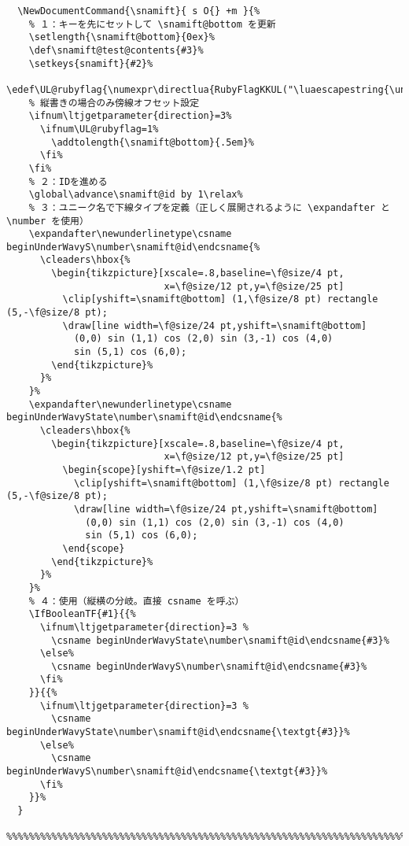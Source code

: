 \documentclass[luatex,fontsize=8pt,paper=b5,twoside]{jlreq}%
\begin{document}
\begin{lstlisting}
  \NewDocumentCommand{\snamift}{ s O{} +m }{%
    % １：キーを先にセットして \snamift@bottom を更新
    \setlength{\snamift@bottom}{0ex}%
    \def\snamift@test@contents{#3}%
    \setkeys{snamift}{#2}%
    \edef\UL@rubyflag{\numexpr\directlua{RubyFlagKKUL("\luaescapestring{\unexpanded\expandafter{\snamift@test@contents}}")}\relax}%
    % 縦書きの場合のみ傍線オフセット設定
    \ifnum\ltjgetparameter{direction}=3%
      \ifnum\UL@rubyflag=1%
        \addtolength{\snamift@bottom}{.5em}%
      \fi%
    \fi%
    % ２：IDを進める
    \global\advance\snamift@id by 1\relax%
    % ３：ユニーク名で下線タイプを定義（正しく展開されるように \expandafter と \number を使用）
    \expandafter\newunderlinetype\csname beginUnderWavyS\number\snamift@id\endcsname{%
      \cleaders\hbox{%
        \begin{tikzpicture}[xscale=.8,baseline=\f@size/4 pt,
                            x=\f@size/12 pt,y=\f@size/25 pt]
          \clip[yshift=\snamift@bottom] (1,\f@size/8 pt) rectangle (5,-\f@size/8 pt);
          \draw[line width=\f@size/24 pt,yshift=\snamift@bottom]
            (0,0) sin (1,1) cos (2,0) sin (3,-1) cos (4,0)
            sin (5,1) cos (6,0);
        \end{tikzpicture}%
      }%
    }%
    \expandafter\newunderlinetype\csname beginUnderWavyState\number\snamift@id\endcsname{%
      \cleaders\hbox{%
        \begin{tikzpicture}[xscale=.8,baseline=\f@size/4 pt,
                            x=\f@size/12 pt,y=\f@size/25 pt]
          \begin{scope}[yshift=\f@size/1.2 pt]
            \clip[yshift=\snamift@bottom] (1,\f@size/8 pt) rectangle (5,-\f@size/8 pt);
            \draw[line width=\f@size/24 pt,yshift=\snamift@bottom]
              (0,0) sin (1,1) cos (2,0) sin (3,-1) cos (4,0)
              sin (5,1) cos (6,0);
          \end{scope}
        \end{tikzpicture}%
      }%
    }%
    % ４：使用（縦横の分岐。直接 csname を呼ぶ）
    \IfBooleanTF{#1}{{%
      \ifnum\ltjgetparameter{direction}=3 %
        \csname beginUnderWavyState\number\snamift@id\endcsname{#3}%
      \else%
        \csname beginUnderWavyS\number\snamift@id\endcsname{#3}%
      \fi%
    }}{{%
      \ifnum\ltjgetparameter{direction}=3 %
        \csname beginUnderWavyState\number\snamift@id\endcsname{\textgt{#3}}%
      \else%
        \csname beginUnderWavyS\number\snamift@id\endcsname{\textgt{#3}}%
      \fi%
    }}%
  }
  %%%%%%%%%%%%%%%%%%%%%%%%%%%%%%%%%%%%%%%%%%%%%%%%%%%%%%%%%%%%%%%%%%%%%%%%%%%%%%%%%%%%%%%%%



\end{lstlisting}
\end{document}
